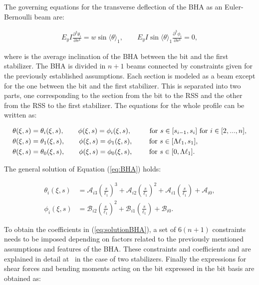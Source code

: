 The governing equations for the transverse deflection of the BHA as an Euler-Bernoulli beam are:

\begin{align}
	E_y I \frac{\partial^3\theta_i}{\partial s^3} = w \sin{\langle \theta \rangle_1}, \qquad E_y I \sin{\langle \theta \rangle_1} \frac{\partial^3\phi_i}{\partial s^3} = 0,\label{eq:BHA}
\end{align}

where  is the average inclination of the BHA between the bit and the first stabilizer. The BHA is divided in $n+1$ beams connected by constraints given for the previously established assumptions. Each section is modeled as a beam except for the one between the bit and the first stabilizer. This is separated into two parts, one corresponding to the section from the bit to the RSS and the other from the RSS to the first stabilizer. The equations for the whole profile can be written as:

\begin{align}
	\theta(\xi,s) &= \theta_{i}(\xi,s), \qquad \phi(\xi,s)= \phi_{i}(\xi,s), \qquad \kern0.1cm\textrm{ for } s \in [s_{i-1},s_{i}] \textrm{ for } i \in [2,...,n], \nonumber
	\\
	\theta(\xi,s) &= \theta_{1}(\xi,s), \qquad \phi(\xi,s)= \phi_{1}(\xi,s), \qquad \textrm{ for } s \in [\Lambda \ell_{1},s_{1}],
	\\
	\theta(\xi,s) &= \theta_{0}(\xi,s), \qquad \phi(\xi,s)= \phi_{0}(\xi,s), \qquad \textrm{ for } s \in [{0}, \Lambda \ell_{1}]. \nonumber
\end{align}

The general solution of Equation (\ref{eq:BHA}) holds:

\begin{align}
	\theta_{i}(\xi,s)&= \mathcal{A}_{i3} \left(\frac{s}{\ell_1}\right)^3 + \mathcal{A}_{i2}\left(\frac{s}{\ell_1}\right)^2+ \mathcal{A}_{i1}\left(\frac{s}{\ell_1}\right) + \mathcal{A}_{i0},
	\nonumber \\
	\phi_{i}(\xi,s)&= \mathcal{B}_{i2}\left(\frac{s}{\ell_1}\right)^2+ \mathcal{B}_{i1}\left(\frac{s}{\ell_1}\right) + \mathcal{B}_{i0}. \label{eq:solutionBHA}
\end{align}

To obtain the coefficients in (\ref{eq:solutionBHA}), a set of $6(n+1)$ constraints needs to be imposed depending on factors related to the previously mentioned assumptions and features of the BHA. These constraints and coefficients  and  are explained in detail at~\cite{Monsieurs2015} in the case of two stabilizers. Finally the expressions for shear forces and bending moments acting on the bit expressed in the bit basis are obtained as:

